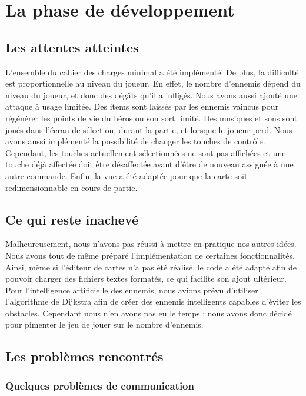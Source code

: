 \section{La phase de développement}

\subsection{Les attentes atteintes}

L'ensemble du cahier des charges minimal a été implémenté. De plus, la difficulté est proportionnelle au niveau du joueur. En effet, le nombre d'ennemis dépend du niveau du joueur, et donc des dégâts qu'il a infligés. Nous avons aussi ajouté une attaque à usage limitée. Des items sont laissés par les ennemis vaincus pour régénérer les points de vie du héros ou son sort limité. Des musiques et sons sont joués dans l'écran de sélection, durant la partie, et lorsque le joueur perd. Nous avons aussi implémenté la possibilité de changer les touches de contrôle. Cependant, les touches actuellement sélectionnées ne sont pas affichées et une touche déjà affectée doit être désaffectée avant d'être de nouveau assignée à une autre commande. Enfin, la vue a été adaptée pour que la carte soit redimensionnable en cours de partie. 

\subsection{Ce qui reste inachevé}

Malheureusement, nous n'avons pas réussi à mettre en pratique nos autres idées. Nous avons tout de même préparé l'implémentation de certaines fonctionnalités. Ainsi, même si l'éditeur de cartes n'a pas été réalisé, le code a été adapté afin de pouvoir charger des fichiers textes formatés, ce qui facilite son ajout ultérieur. 
Pour l'intelligence artificielle des ennemis, nous avions prévu d'utiliser l'algorithme de Dijkstra afin de créer des ennemis intelligents capables d'éviter les obstacles. Cependant nous n'en avons pas eu le temps ; nous avons donc décidé pour pimenter le jeu de jouer sur le nombre d'ennemis.

\subsection{Les problèmes rencontrés}

	\subsubsection{Quelques problèmes de communication}
 
